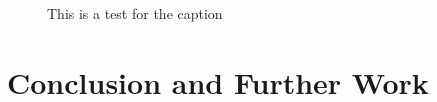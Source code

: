 \documentclass[draft,final]{vutinfth} %
\begin{document}
\begin{figure}[h]
\begin{scriptsize}
        \end{scriptsize} \caption{This is a test for the caption}


    \end{figure}

    \glsresetall


    \chapter{Conclusion and Further Work}

    \backmatter
    \listoffigures %

    \cleardoublepage %
    \listoftables %

    \listofalgorithms

    \printindex

    \printglossaries

    
    

\end{document}
